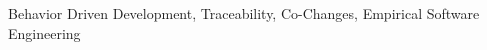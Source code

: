 \documentclass[10pt, conference, compsocconf]{IEEEtran}
\begin{document}
%
%

\begin{IEEEkeywords}Behavior Driven Development, Traceability, Co-Changes, Empirical Software Engineering
\end{IEEEkeywords}















\end{document}
